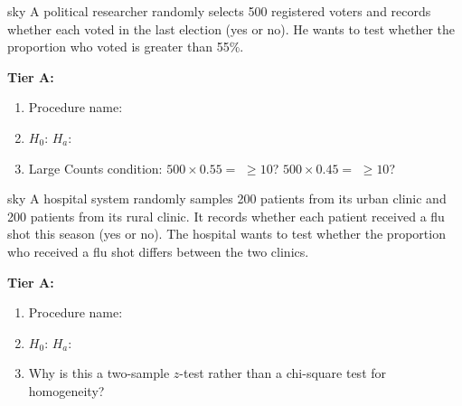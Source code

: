 \documentclass[10pt]{article}
\begin{document}
\begin{scenariobox}{sky}
A political researcher randomly selects 500 registered voters and records whether each voted
in the last election (yes or no). He wants to test whether the proportion who voted is
greater than 55\%.

\textbf{Tier A:}
\begin{enumerate}
  \item Procedure name: 
  \item $H_0$:  \quad $H_a$: 
  \item Large Counts condition: $500 \times 0.55 =$  $\ge 10$?  \quad
        $500 \times 0.45 =$  $\ge 10$? 
\end{enumerate}
\end{scenariobox}

\begin{scenariobox}{sky}
A hospital system randomly samples 200 patients from its urban clinic and 200 patients from
its rural clinic. It records whether each patient received a flu shot this season (yes or no).
The hospital wants to test whether the proportion who received a flu shot differs between the
two clinics.

\textbf{Tier A:}
\begin{enumerate}
  \item Procedure name: 
  \item $H_0$:  \quad $H_a$: 
  \item Why is this a two-sample $z$-test rather than a chi-square test for homogeneity?
\end{enumerate}
\end{scenariobox}
\end{document}
